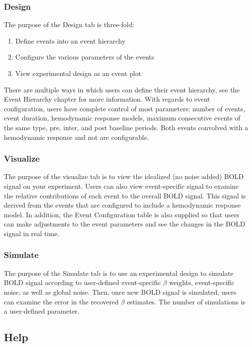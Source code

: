 \documentclass[10pt]{article}
\begin{document}
		\subsubsection{Design}
		\label{subsubsec:design}
			The purpose of the Design tab is three-fold:
			\begin{enumerate}
				\item Define events into an event hierarchy
				\item Configure the various parameters of the events
				\item View experimental design as an event plot
			\end{enumerate}

			There are multiple ways in which users can define their event hierarchy, see the Event Hierarchy chapter for more information.
			With regards to event configuration, users have complete control of most parameters: number of events, event duration, hemodynamic response models, maximum consecutive events of the same type, pre, inter, and post baseline periods.
			Both events convolved with a hemodynamic response and not are configurable.

		\subsubsection{Visualize}
		\label{subsubsec:visualize}
			The purpose of the visualize tab is to view the idealized (no noise added) BOLD signal on your experiment.
			Users can also view event-specific signal to examine the relative contributions of each event to the overall BOLD signal.
			This signal is derived from the events that are configured to include a hemodynamic response model.
			In addition, the Event Configuration table is also supplied so that users can make adjustments to the event parameters and see the changes in the BOLD signal in real time.

		\subsubsection{Simulate}
		\label{subsubsec:simulate}
			The purpose of the Simulate tab is to use an experimental design to simulate BOLD signal according to user-defined event-specific $\beta$ weights, event-specific noise, as well as global noise.
			Then, once new BOLD signal is simulated, users can examine the error in the recovered $\beta$ estimates.
			The number of simulations is a user-defined parameter.

	\subsection{Help}
	\label{subsec:help}
\end{document}
